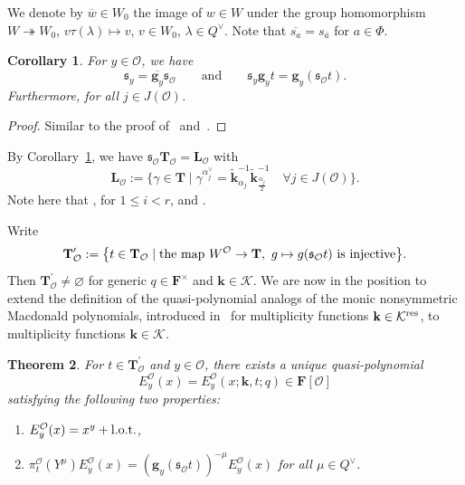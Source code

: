 \documentclass[pdftex]{sigma}
\numberwithin{equation}{section}
\newtheorem{Theorem}{Theorem}[section]
\newtheorem{Corollary}[Theorem]{Corollary}
\begin{document}
We denote by $\overline{w}\in W_0$ the image
of $w\in W$ under the group homomorphism $W\twoheadrightarrow W_0$, ${v\tau(\lambda)\mapsto v}$, $v\in W_0$, $\lambda\in Q^\vee$.
Note that $\overline{s_{a}}=s_{\overline{a}}$ for $a\in\Phi$.

\begin{Corollary}\label{sycor}
For $y\in\mathcal{O}$, we have
\[
\mathfrak{s}_y=\overline{\mathbf{g}_y}\mathfrak{s}_\mathcal{O}\qquad \text{and}\qquad \mathfrak{s}_y\mathbf{g}_yt=\mathbf{g}_y(\mathfrak{s}_{\mathcal{O}}t).
\]
Furthermore,  for all $j\in J(\mathcal{O})$.
\end{Corollary}

\begin{proof}
Similar to the proof of~\cite[Proposition~5.4]{SSV2} and~\cite[Corollary~5.5]{SSV2}.
\end{proof}

By Corollary~\ref{sycor}, we have $\mathfrak{s}_\mathcal{O}\mathbf{T}_\mathcal{O}=\mathbf{L}_\mathcal{O}$
with
\begin{equation}\label{LO}
\mathbf{L}_\mathcal{O}:=
\bigl\{\gamma\in\mathbf{T}\mid \gamma^{\alpha_j^\vee}=\widetilde{\mathbf{k}}_{\alpha_j}^{-1}\widetilde{\mathbf{k}}_{\frac{\alpha_j}{2}}^{-1}\quad \forall j\in
J(\mathcal{O})\bigr\}.
\end{equation}
Note here that ,  for $1\leq i<r$, and .

Write
\[
\mathbf{T}_\mathcal{O}^\prime:=\bigl\{t\in\mathbf{T}_\mathcal{O} \mid \textup{the map}\ W^\mathcal{O}\rightarrow\mathbf{T},\ g\mapsto g(\mathfrak{s}_\mathcal{O}t)\ \text{is injective}\bigr\}.
\]
Then $\mathbf{T}_{\mathcal{O}}^\prime\not=\varnothing$ for generic $q\in\mathbf{F}^\times$ and $\mathbf{k}\in\mathcal{K}$.
We are now in the position to extend the definition of the quasi-polynomial analogs of the monic nonsymmetric Macdonald polynomials, introduced in~\cite[Theorem~6.2]{SSV2}
for multiplicity functions $\mathbf{k}\in\mathcal{K}^{{\rm res}}$, to multiplicity functions
$\mathbf{k}\in\mathcal{K}$.

\begin{Theorem}\label{EJycor}
For $t\in\mathbf{T}_\mathcal{O}^\prime$ and $y\in\mathcal{O}$, there exists a unique quasi-polynomial
\[
E^\mathcal{O}_y(x)=E_y^\mathcal{O}(x;\mathbf{k},t;q)\in\mathbf{F}[\mathcal{O}]
\]
satisfying the following two properties:
\begin{enumerate}\itemsep=0pt
\item[$(a)$] $E_y^\mathcal{O}(x)=x^y+ {\rm l.o.t.}$,
\item[$(b)$] $\pi_{t}^\mathcal{O}(Y^\mu)E_y^\mathcal{O}(x)=(\mathbf{g}_y(\mathfrak{s}_\mathcal{O}t))^{-\mu}E_y^\mathcal{O}(x)$ for all $\mu\in Q^\vee$.
\end{enumerate}
\end{Theorem}
\end{document}
